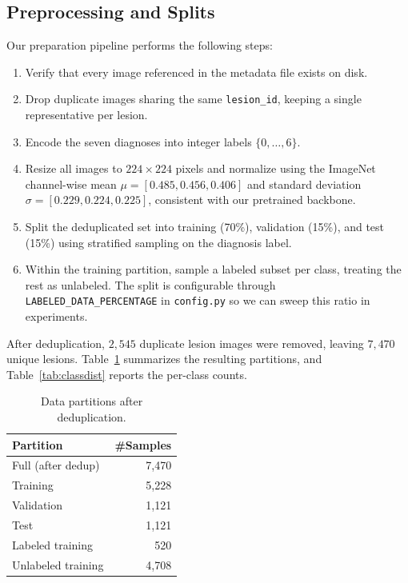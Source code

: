 \documentclass[conference]{IEEEtran}
\begin{document}
\subsection{Preprocessing and Splits}
\label{sec:splits}
Our preparation pipeline performs the following steps:
\begin{enumerate}
    \item Verify that every image referenced in the metadata file
    exists on disk.
    \item Drop duplicate images sharing the same \texttt{lesion\_id},
    keeping a single representative per lesion.
    \item Encode the seven diagnoses into integer labels $\{0,\ldots,6\}$.
    \item Resize all images to $224 \times 224$ pixels and normalize
    using the ImageNet channel-wise mean
    $\mu = [0.485, 0.456, 0.406]$ and standard deviation
    $\sigma = [0.229, 0.224, 0.225]$, consistent with our pretrained
    backbone.
    \item Split the deduplicated set into training (70\%),
    validation (15\%), and test (15\%) using stratified sampling
    on the diagnosis label.
    \item Within the training partition, sample a labeled subset
    per class, treating the rest as unlabeled. The split is
    configurable through \texttt{LABELED\_DATA\_PERCENTAGE} in
    \texttt{config.py} so we can sweep this ratio in experiments.
\end{enumerate}

After deduplication, $2{,}545$ duplicate lesion images were removed,
leaving $7{,}470$ unique lesions. Table~\ref{tab:splits} summarizes
the resulting partitions, and Table~\ref{tab:classdist} reports the
per-class counts.

\begin{table}[h]
\centering
\caption{Data partitions after deduplication.}
\label{tab:splits}
\begin{tabular}{lr}
\hline
\textbf{Partition} & \textbf{\#Samples} \\ \hline
Full (after dedup)         & 7{,}470 \\
Training                   & 5{,}228 \\
Validation                 & 1{,}121 \\
Test                       & 1{,}121 \\
\quad Labeled training     & 520 \\
\quad Unlabeled training   & 4{,}708 \\
\hline
\end{tabular}
\end{table}
\end{document}
